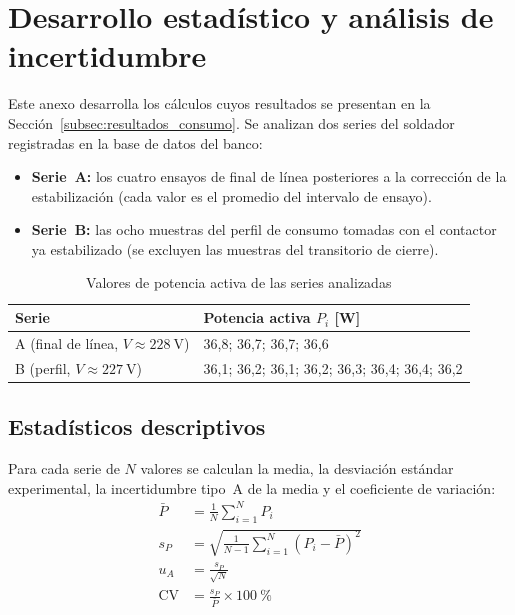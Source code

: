 \section{Desarrollo estadístico y análisis de incertidumbre}
\label{anx:estadistica}

Este anexo desarrolla los cálculos cuyos resultados se presentan en la
Sección~\ref{subsec:resultados_consumo}. Se analizan dos series del soldador
registradas en la base de datos del banco:
\begin{itemize}
    \item \textbf{Serie~A:} los cuatro ensayos de final de línea posteriores a la
          corrección de la estabilización (cada valor es el promedio del
          intervalo de ensayo).
    \item \textbf{Serie~B:} las ocho muestras del perfil de consumo tomadas con el
          contactor ya estabilizado (se excluyen las muestras del transitorio de
          cierre).
\end{itemize}

\begin{table}[htbp]
\centering
\caption{Valores de potencia activa de las series analizadas}
\label{tab:series}
\renewcommand{\arraystretch}{1.25}
\begin{tabular}{@{} l l @{}}
\toprule
\textbf{Serie} & \textbf{Potencia activa $P_i$ [\si{\watt}]} \\
\midrule
A (final de línea, $V \approx \SI{228}{\volt}$) & 36,8; 36,7; 36,7; 36,6 \\
B (perfil, $V \approx \SI{227}{\volt}$)
  & 36,1; 36,2; 36,1; 36,2; 36,3; 36,4; 36,4; 36,2 \\
\bottomrule
\end{tabular}
\end{table}

\subsection{Estadísticos descriptivos}

Para cada serie de $N$ valores se calculan la media, la desviación estándar
experimental, la incertidumbre tipo~A de la media y el coeficiente de variación:
\begin{align}
    \bar{P} &= \frac{1}{N}\sum_{i=1}^{N} P_i
    \label{eq:media} \\
    s_P &= \sqrt{\frac{1}{N-1}\sum_{i=1}^{N}\left(P_i - \bar{P}\right)^2}
    \label{eq:desvio} \\
    u_A &= \frac{s_P}{\sqrt{N}}
    \label{eq:tipoA} \\
    \mathrm{CV} &= \frac{s_P}{\bar{P}} \times \SI{100}{\percent}
    \label{eq:cv}
\end{align}

